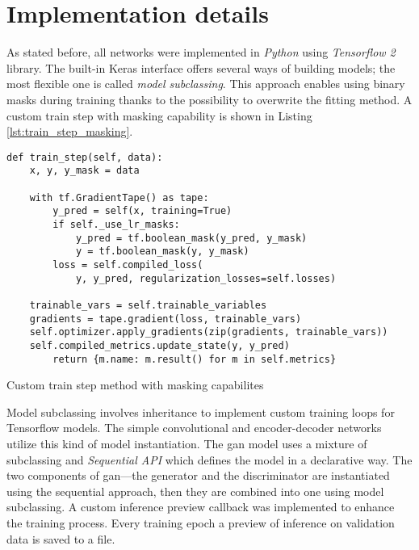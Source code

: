 \section{Implementation details}
As stated before, all networks were implemented in \textit{Python} using \textit{Tensorflow 2} library.
The built-in Keras interface offers several ways of building models; the most flexible one is called \textit{model subclassing}.
This approach enables using binary masks during training thanks to the possibility to overwrite the fitting method.
A custom train step with masking capability is shown in Listing \ref{lst:train_step_masking}.
\begin{listing}
\begin{verbatim}
def train_step(self, data):
    x, y, y_mask = data

    with tf.GradientTape() as tape:
        y_pred = self(x, training=True)
        if self._use_lr_masks:
            y_pred = tf.boolean_mask(y_pred, y_mask)
            y = tf.boolean_mask(y, y_mask)
        loss = self.compiled_loss(
            y, y_pred, regularization_losses=self.losses)

    trainable_vars = self.trainable_variables
    gradients = tape.gradient(loss, trainable_vars)
    self.optimizer.apply_gradients(zip(gradients, trainable_vars))
    self.compiled_metrics.update_state(y, y_pred)
        return {m.name: m.result() for m in self.metrics}
\end{verbatim}
\caption{Custom train step method with masking capabilites}
\label{lst:train_step_masking}
\end{listing}

Model subclassing involves inheritance to implement custom training loops for Tensorflow models.
The simple convolutional and encoder-decoder networks utilize this kind of model instantiation.
The \gls{gan} model uses a mixture of subclassing and \textit{Sequential API} which defines the model in a declarative way.
The two components of \gls{gan}---the generator and the discriminator are instantiated using the sequential approach, then they are combined into one using model subclassing.
A custom inference preview callback was implemented to enhance the training process.
Every training epoch a preview of inference on validation data is saved to a file.

